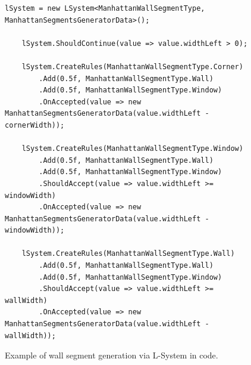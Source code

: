 \begin{figure}[H]
  \begin{lstlisting}[]
    lSystem = new LSystem<ManhattanWallSegmentType, ManhattanSegmentsGeneratorData>();

    lSystem.ShouldContinue(value => value.widthLeft > 0);

    lSystem.CreateRules(ManhattanWallSegmentType.Corner)
        .Add(0.5f, ManhattanWallSegmentType.Wall)
        .Add(0.5f, ManhattanWallSegmentType.Window)
        .OnAccepted(value => new ManhattanSegmentsGeneratorData(value.widthLeft - cornerWidth));

    lSystem.CreateRules(ManhattanWallSegmentType.Window)
        .Add(0.5f, ManhattanWallSegmentType.Wall)
        .Add(0.5f, ManhattanWallSegmentType.Window)
        .ShouldAccept(value => value.widthLeft >= windowWidth)
        .OnAccepted(value => new ManhattanSegmentsGeneratorData(value.widthLeft - windowWidth));

    lSystem.CreateRules(ManhattanWallSegmentType.Wall)
        .Add(0.5f, ManhattanWallSegmentType.Wall)
        .Add(0.5f, ManhattanWallSegmentType.Window)
        .ShouldAccept(value => value.widthLeft >= wallWidth)
        .OnAccepted(value => new ManhattanSegmentsGeneratorData(value.widthLeft - wallWidth));
  \end{lstlisting}
  \label{fig:lsystem-example}
  \caption{Example of wall segment generation via L-System in code.}
\end{figure}
